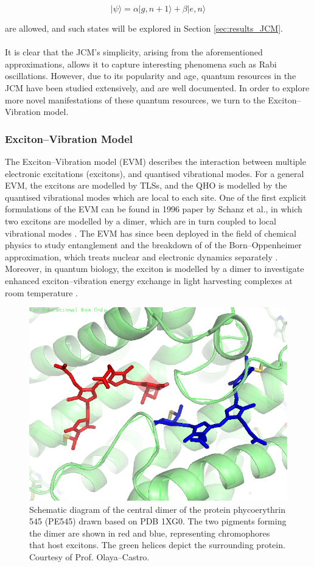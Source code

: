 \documentclass[11pt]{article}
\begin{document}
\begin{equation} \label{JCM_general_state}
    |\psi\rangle = \alpha|g,n+1\rangle + \beta|e,n\rangle
\end{equation} 

are allowed, and such states will be explored in Section \ref{sec:results_JCM}.\\
\\
It is clear that the JCM's simplicity, arising from the aforementioned approximations, allows it to capture interesting phenomena such as Rabi oscillations. However, due to its popularity and age, quantum resources in the JCM have been studied extensively, and are well documented. In order to explore more novel manifestations of these quantum resources, we turn to the Exciton--Vibration model. 

\subsubsection{Exciton--Vibration Model}  \label{sec:theory_subsub_EVM}
The Exciton--Vibration model (EVM) describes the interaction between multiple electronic excitations (excitons), and quantised vibrational modes. For a general EVM, the excitons are modelled by TLSs, and the QHO is modelled by the quantised vibrational modes which are local to each site. One of the first explicit formulations of the EVM can be found in 1996 paper by Schanz et al., in which two excitons are modelled by a dimer, which are in turn coupled to local vibrational modes \cite{ExVib1997-First}. The EVM has since been deployed in the field of chemical physics to study entanglement and the breakdown of of the Born--Oppenheimer approximation, which treats nuclear and electronic dynamics separately \cite{ExVib2015-ChemPhysBorn}. Moreover, in quantum biology, the exciton is modelled by a dimer to investigate enhanced exciton--vibration energy exchange in light harvesting complexes at room temperature \cite{ExVib2014-Alexandra}.\\

\begin{figure}[H]
    \centering
    \includegraphics[width=0.5\linewidth]{Images/PEB50dimer.png}
    \caption{Schematic diagram of the central dimer of the protein phycoerythrin 545 (PE545) drawn based on PDB 1XG0. The two pigments forming the dimer are shown in red and blue, representing chromophores that host excitons. The green helices depict the surrounding protein. Courtesy of Prof. Olaya--Castro.}
    \label{fig:dimer}
\end{figure}
\end{document}
